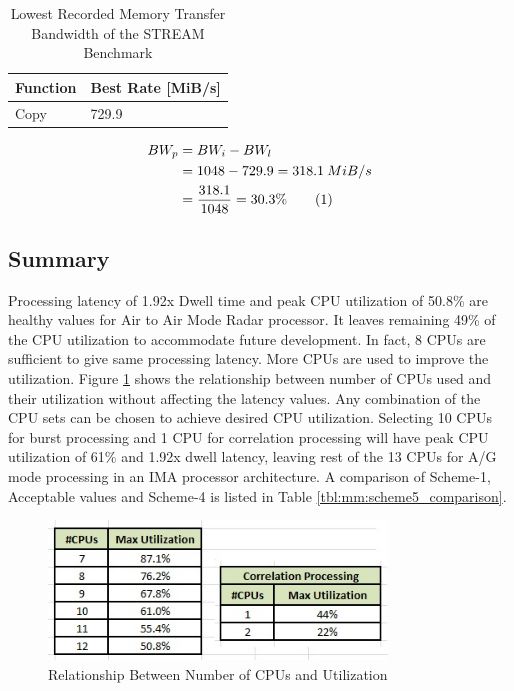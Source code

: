 \begin{table}[h!]
	\centering
	\begin{tabular}{|l|l|} 
	 \hline
	 \textbf{Function} & \textbf{Best Rate [MiB/s]} \\
	 \hline
	 Copy & 729.9 \\ \hline
	\end{tabular}
	\caption{Lowest Recorded Memory Transfer Bandwidth of the STREAM Benchmark}
	\label{tbl:mm:scheme5_mem_bw}
\end{table}

\begin{align*}
\label{aa:scheme4:mem_bw}
	BW_{p} &= BW_{i} - BW_{l} \\
	&= 1048 - 729.9 =  318.1 \: MiB/s \\
	&= \frac{318.1}{1048} = 30.3 \% \stepcounter{equation}\tag{\theequation} 
\end{align*}

\subsection{Summary}
\label{ss:mm:scheme5:summary}

Processing latency of 1.92x Dwell time and peak CPU utilization of 50.8\% are healthy values for Air to Air Mode Radar processor. It leaves remaining 49\% of the CPU utilization to accommodate future development. In fact, 8 CPUs are sufficient to give same processing latency. More CPUs are used to improve the utilization. Figure \ref{fig:mm:scheme5_summary} shows the relationship between number of CPUs used and their utilization without affecting the latency values. Any combination of the CPU sets can be chosen to achieve desired CPU utilization. Selecting 10 CPUs for burst processing and 1 CPU for correlation processing will have peak CPU utilization of 61\% and 1.92x dwell latency, leaving rest of the 13 CPUs for A/G mode processing in an IMA processor architecture. A comparison of  Scheme-1, Acceptable values and Scheme-4 is listed in Table \ref{tbl:mm:scheme5_comparison}.

\begin{figure}[h!]
	\centering
	\includegraphics[width=90mm]{figures/scheme5_summary}
	\caption{Relationship Between Number of CPUs and Utilization}
	\label{fig:mm:scheme5_summary}
\end{figure}

